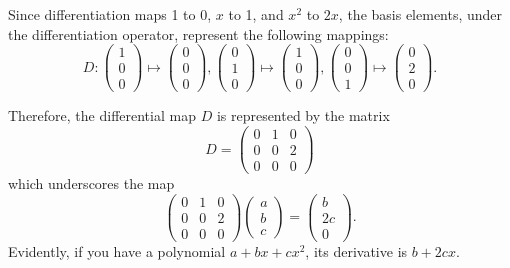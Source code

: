\documentclass[a4paper, 12pt,oneside,openany]{book}
\begin{document}
{Since differentiation maps 1 to 0, $x$ to 1, and $x^2$ to $2x$, the basis elements, under the differentiation operator, represent the following mappings: $$D:\begin{pmatrix} 1\\0\\0 \end{pmatrix} \mapsto \begin{pmatrix} 0\\0\\0 \end{pmatrix}, \begin{pmatrix} 0\\1\\0 \end{pmatrix} \mapsto \begin{pmatrix} 1\\0\\0 \end{pmatrix}, \begin{pmatrix} 0\\0\\1 \end{pmatrix} \mapsto \begin{pmatrix} 0\\2\\0 \end{pmatrix}.$$

Therefore, the differential map $D$ is represented by the matrix $$D=\begin{pmatrix} 0&1&0\\0&0&2\\0&0&0 \end{pmatrix}$$ which underscores the map $$\begin{pmatrix} 0&1&0\\0&0&2\\0&0&0 \end{pmatrix} \begin{pmatrix} a\\b\\c \end{pmatrix} = \begin{pmatrix} b\\2c\\0 \end{pmatrix}.$$ Evidently, if you have a polynomial $a+bx+cx^2$, its derivative is $b+2cx$. 

}
\end{document}
